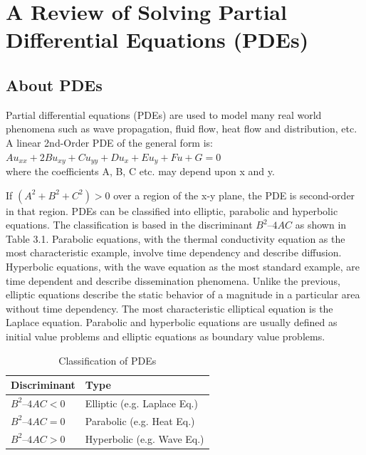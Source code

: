 
\chapter{A Review of Solving Partial Differential Equations (PDEs)}
\section{About PDEs}

Partial differential equations (PDEs) are used to model many real world phenomena such as wave propagation, fluid flow, heat flow and distribution, etc. A linear 2nd-Order PDE of the general form is:\\
$Au_{xx} + 2Bu_{xy} + Cu_{yy} + Du_{x} + Eu_{y} + Fu + G = 0$\\
where the coefficients A, B, C etc.  may depend upon x and y. 

If $(A^2+ B^2+C^2) >0$ over a region of the x-y plane, the PDE is second-order in that region. PDEs can be classified into elliptic, parabolic and hyperbolic equations. The classification is based in the discriminant $B^2 – 4AC$ as shown in Table 3.1. Parabolic equations, with the thermal conductivity equation as the most characteristic example, involve time dependency and describe diffusion. Hyperbolic equations, with the wave equation as the most standard example, are time dependent and describe dissemination phenomena. Unlike the previous, elliptic equations describe the static behavior of a magnitude in a particular area without time dependency. The most characteristic elliptical equation is the Laplace equation. Parabolic and hyperbolic equations are usually defined as initial value problems and elliptic equations as boundary value problems.

\begin{table}[H]
    \begin{center}
        \begin{tabular}{| l | l |}
        \hline
        Discriminant   & Type 	\\ \hline
        $B^2 – 4AC < 0$   & Elliptic (e.g. Laplace Eq.) 	\\ \hline
        $B^2  – 4AC = 0$  &	Parabolic (e.g. Heat Eq.)        \\ \hline
        $B^2 – 4AC > 0$  & Hyperbolic (e.g. Wave Eq.) 	\\ \hline       
        \end{tabular}
    \end{center}
    \caption{Classification of PDEs}
    \label{table:trainingset}
\end{table}

